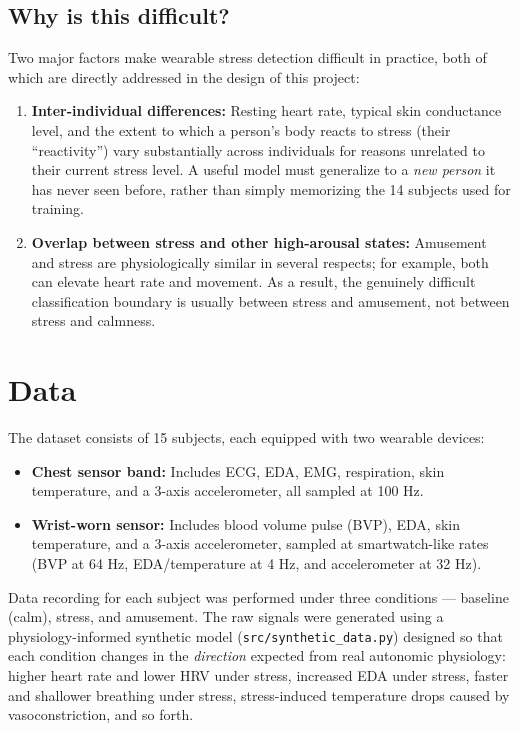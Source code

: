 \documentclass[12pt,a4paper]{article}
\begin{document}
	\subsection{Why is this difficult?}
	
	Two major factors make wearable stress detection difficult in practice, both of which are directly addressed in the design of this project:
	
	\begin{enumerate}
		\item \textbf{Inter-individual differences:} Resting heart rate, typical skin conductance level, and the extent to which a person's body reacts to stress (their ``reactivity'') vary substantially across individuals for reasons unrelated to their current stress level. A useful model must generalize to a \textit{new person} it has never seen before, rather than simply memorizing the 14 subjects used for training.
		
		\item \textbf{Overlap between stress and other high-arousal states:} Amusement and stress are physiologically similar in several respects; for example, both can elevate heart rate and movement. As a result, the genuinely difficult classification boundary is usually between stress and amusement, not between stress and calmness.
	\end{enumerate}
	
	\section{Data}
	
	The dataset consists of 15 subjects, each equipped with two wearable devices:
	
	\begin{itemize}
		\item \textbf{Chest sensor band:} Includes ECG, EDA, EMG, respiration, skin temperature, and a 3-axis accelerometer, all sampled at 100 Hz.
		\item \textbf{Wrist-worn sensor:} Includes blood volume pulse (BVP), EDA, skin temperature, and a 3-axis accelerometer, sampled at smartwatch-like rates (BVP at 64 Hz, EDA/temperature at 4 Hz, and accelerometer at 32 Hz).
	\end{itemize}
	
	Data recording for each subject was performed under three conditions --- baseline (calm), stress, and amusement. The raw signals were generated using a physiology-informed synthetic model (\texttt{src/synthetic\_data.py}) designed so that each condition changes in the \textit{direction} expected from real autonomic physiology: higher heart rate and lower HRV under stress, increased EDA under stress, faster and shallower breathing under stress, stress-induced temperature drops caused by vasoconstriction, and so forth.
	
\end{document}

